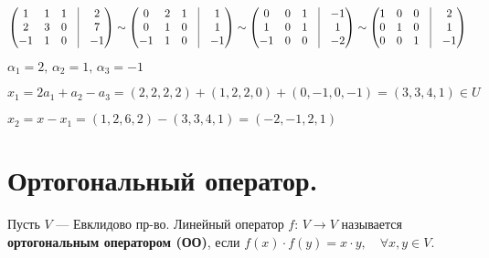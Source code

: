 \documentclass[a4paper, 12pt]{report}
\begin{document}
	$\begin{pmatrix}
		1&1&1&\vrule&2\\
		2&3&0&\vrule&7\\
		-1&1&0&\vrule&-1\\ 
	\end{pmatrix}
	\sim \begin{pmatrix}
		0&2&1&\vrule&1\\
		0&1&0&\vrule&1\\
		-1&1&0&\vrule&-1\\
	\end{pmatrix} 
	\sim \begin{pmatrix}
		0&0&1&\vrule&-1\\
		1&0&1&\vrule&1\\
		-1&0&0&\vrule&-2\\
	\end{pmatrix}
	\sim \begin{pmatrix}
		1&0&0&\vrule&2\\
		0&1&0&\vrule&1\\
		0&0&1&\vrule&-1\\
	\end{pmatrix} 
	$\par
	$ \alpha_1=2, \, \alpha_2=1, \, \alpha_3=-1$\par
	$ x_1=2a_1+a_2-a_3=(2,2,2,2)+(1,2,2,0)+(0,-1,0,-1)=(3,3,4,1) \in U$\par
	$x_2=x-x_1=(1,2,6,2)-(3,3,4,1)=(-2,-1,2,1)$\par
	
	
	
	
	
	
	
	
	
	
	\section{Ортогональный оператор.}
	
	\quad\; Пусть $V$ --- Евклидово пр-во. Линейный оператор $f$: $ V \to V$ называется \textbf{ортогональным оператором (ОО)}, если $f(x) \cdot f(y)
	= x \cdot y,\quad \forall x,y \in V$.
	
	\par\bigskip
	
\end{document}
